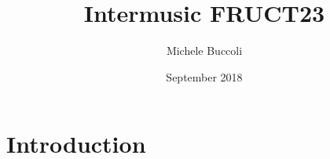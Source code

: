 \documentclass{article}
\title{Intermusic FRUCT23}
\author{Michele Buccoli}
\date{September 2018}
\begin{document}
\maketitle

\section{Introduction}
\end{document}
